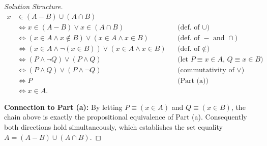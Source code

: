 \documentclass[11pt]{article}
\begin{document}
\begin{enumerate}
\begin{proof}[Solution Structure]
        \begin{align*}
        x &\in (A - B) \cup (A \cap B) \\
        &\iff x \in (A - B) \lor x \in (A \cap B) 
            && \text{(def.\ of $\cup$)} \\
        &\iff (x \in A \land x \notin B) \lor (x \in A \land x \in B) 
            && \text{(def.\ of $-$ and $\cap$)} \\
        &\iff (x \in A \land \neg(x \in B)) \lor (x \in A \land x \in B) 
            && \text{(def.\ of $\notin$)} \\
        &\iff (P \land \neg Q) \lor (P \land Q) 
            && \text{(let $P \equiv x\in A$, $Q \equiv x\in B$)} \\
        &\iff (P \land Q) \lor (P \land \neg Q) 
            && \text{(commutativity of $\lor$)} \\
        &\iff P 
            && \text{(Part (a))} \\
        &\iff x \in A.
        \end{align*}
        
        \noindent\textbf{Connection to Part (a):}  
        By letting $P \equiv (x \in A)$ and $Q \equiv (x \in B)$, the chain above 
        is exactly the propositional equivalence of Part (a). Consequently both 
        directions hold simultaneously, which establishes the set equality 
        $A = (A - B) \cup (A \cap B)$.
    \end{proof}
\end{enumerate}

\newpage
\end{document}
